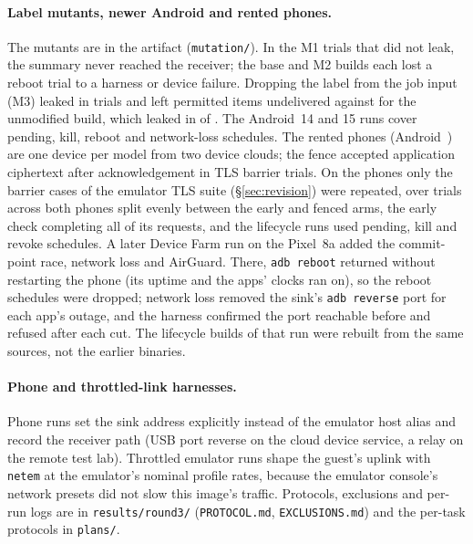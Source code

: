 \paragraph{Label mutants, newer Android and rented phones.}\label{app:generality} The mutants are in the artifact
(\texttt{mutation/}). In the M1 trials that did not leak, the summary never reached the receiver; the base and M2 builds
each lost a reboot trial to a harness or device failure. Dropping the label from the job input (M3) leaked in
\mutThreeLeak{} trials and left \mutThreeDeficit{} permitted items undelivered against \mutBaseDeficit{} for the unmodified
build, which leaked in \mutBaseLeak{} of \mutBaseTrials{}. The Android~14 and 15 runs cover pending, kill, reboot and
network-loss schedules. The rented phones (Android~\devAndroid{}) are one device per model from two device clouds; the
fence accepted application ciphertext after acknowledgement in \devFenceAfterAck{} TLS barrier trials. On the phones only
the barrier cases of the emulator TLS suite (\S\ref{sec:revision}) were repeated, over
\devTrials{} trials across both phones split evenly between the early and fenced arms, the early check completing all
\devEarlyComplete{} of its requests, and the lifecycle runs used pending,
kill and revoke schedules. A later Device Farm run on the Pixel~8a added the commit-point race, network loss and
AirGuard. There, \texttt{adb reboot} returned without restarting the phone (its uptime and the apps' clocks ran on), so
the reboot schedules were dropped; network loss removed the sink's \texttt{adb reverse} port for each app's outage, and
the harness confirmed the port reachable before and refused after each cut. The lifecycle builds of that run were
rebuilt from the same sources, not the earlier binaries.

\paragraph{Phone and throttled-link harnesses.} Phone runs set the sink address explicitly instead of the emulator host
alias and record the receiver path (USB port reverse on the cloud device service, a relay on the remote test lab).
Throttled emulator runs shape the guest's uplink with \texttt{netem} at the emulator's nominal profile rates, because the
emulator console's network presets did not slow this image's traffic. Protocols, exclusions and per-run logs are in
\texttt{results/round3/} (\texttt{PROTOCOL.md}, \texttt{EXCLUSIONS.md}) and the per-task protocols in \texttt{plans/}.

